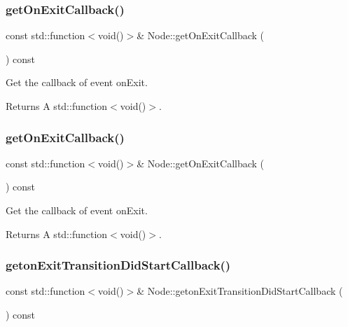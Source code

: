 \subsubsection{\texorpdfstring{get\+On\+Exit\+Callback()}{getOnExitCallback()}\hspace{0.1cm}{\footnotesize\ttfamily [1/2]}}
{\footnotesize\ttfamily const std\+::function$<$void()$>$\& Node\+::get\+On\+Exit\+Callback (\begin{DoxyParamCaption}{ }\end{DoxyParamCaption}) const\hspace{0.3cm}{\ttfamily [inline]}}

Get the callback of event on\+Exit. \begin{DoxyReturn}{Returns}
A std\+::function$<$void()$>$. 
\end{DoxyReturn}
\mbox{\label{classNode_ab0b4c33e5b8ef5770d0f4d8ed410e596}} 
\subsubsection{\texorpdfstring{get\+On\+Exit\+Callback()}{getOnExitCallback()}\hspace{0.1cm}{\footnotesize\ttfamily [2/2]}}
{\footnotesize\ttfamily const std\+::function$<$void()$>$\& Node\+::get\+On\+Exit\+Callback (\begin{DoxyParamCaption}{ }\end{DoxyParamCaption}) const\hspace{0.3cm}{\ttfamily [inline]}}

Get the callback of event on\+Exit. \begin{DoxyReturn}{Returns}
A std\+::function$<$void()$>$. 
\end{DoxyReturn}
\mbox{\label{classNode_a306d572d520d31dd83ed3eedd2b78d4e}} 
\subsubsection{\texorpdfstring{geton\+Exit\+Transition\+Did\+Start\+Callback()}{getonExitTransitionDidStartCallback()}\hspace{0.1cm}{\footnotesize\ttfamily [1/2]}}
{\footnotesize\ttfamily const std\+::function$<$void()$>$\& Node\+::geton\+Exit\+Transition\+Did\+Start\+Callback (\begin{DoxyParamCaption}{ }\end{DoxyParamCaption}) const\hspace{0.3cm}{\ttfamily [inline]}}


